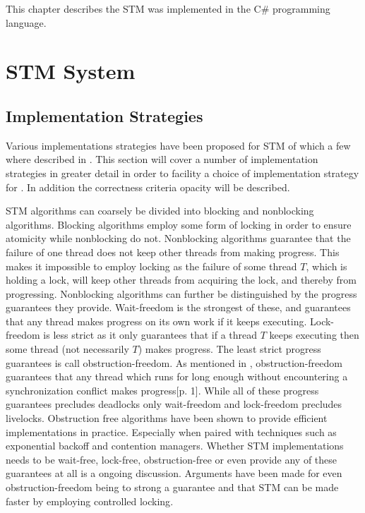\makeatletter {}\makeatother
{}
This chapter describes the \ac{STM} was implemented in the C\# programming language.
\label{chap:implementation}
\section{\acs{STM} System}
\subsection{Implementation Strategies}
Various implementations strategies have been proposed for \ac{STM} of which a few where described in . This section will cover a number of implementation strategies in greater detail in order to facility a choice of implementation strategy for \stmname. In addition the correctness criteria opacity will be described.

\ac{STM} algorithms can coarsely be divided into blocking and nonblocking algorithms\cite[p. 47]{harris2010transactional}. Blocking algorithms employ some form of locking in order to ensure atomicity while nonblocking do not\cite[p. 59]{herlihy2012art}. Nonblocking algorithms guarantee that the failure of one thread does not keep other threads from making progress\cite[p. 47]{harris2010transactional}\cite[p. 142]{herlihy1991wait}\cite[p. 59]{herlihy2012art}. This  makes it impossible to employ locking as the failure of some thread $T$, which is holding a lock, will keep other threads from acquiring the lock, and thereby from progressing. Nonblocking algorithms can further be distinguished by the progress guarantees they provide. Wait-freedom is the strongest of these, and guarantees that any thread makes progress on its own work if it keeps executing\cite[p. 124]{herlihy1991wait}\cite[p. 59]{herlihy2012art}. Lock-freedom is less strict as it only guarantees that if a thread $T$ keeps executing then some thread (not necessarily $T$) makes progress\cite[p. 47]{harris2010transactional}\cite[p. 60]{herlihy2012art}. The least strict progress guarantees is call obstruction-freedom\cite[p. 47]{harris2010transactional}\cite{herlihy2003obstruction}\cite[p. 61]{herlihy2012art}. As mentioned in , obstruction-freedom guarantees that any thread which runs for long enough without encountering a synchronization conflict makes progress\cite{herlihy2003obstruction}[p. 1]. While all of these progress guarantees precludes deadlocks only wait-freedom and lock-freedom precludes livelocks\cite[p. 47]{harris2010transactional}. Obstruction free algorithms have been shown to provide efficient implementations in practice\cite[p. 61]{herlihy2012art}. Especially when paired with techniques such as exponential backoff\cite[p. 147]{herlihy2012art} and contention managers\cite[p. 51]{harris2010transactional}.  Whether \ac{STM} implementations needs to be wait-free, lock-free, obstruction-free or even provide any of these guarantees at all is a ongoing discussion. Arguments have been made for even obstruction-freedom being to strong a guarantee and that \ac{STM} can be made faster by employing controlled locking\cite{ennals2006software}.

